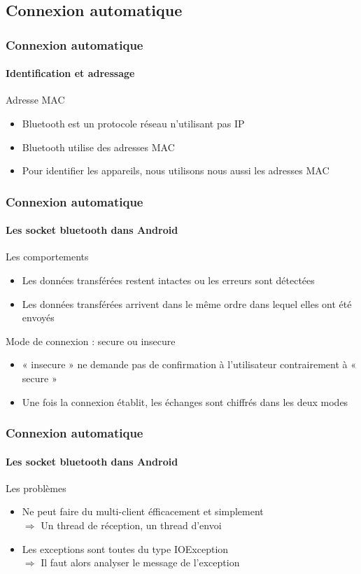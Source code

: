 \documentclass{beamer}
\begin{document}
    \subsection{Connexion automatique}
    \begin{frame}
      \frametitle{Connexion automatique}
      \framesubtitle{Identification et adressage}
      \begin{block}{Adresse MAC}
        \begin{itemize}
          \item Bluetooth est un protocole réseau n'utilisant pas IP
          \item Bluetooth utilise des adresses MAC
          \item Pour identifier les appareils, nous utilisons nous aussi les adresses MAC
        \end{itemize}
      \end{block}
    \end{frame}
    \begin{frame}
      \frametitle{Connexion automatique}
      \framesubtitle{Les socket bluetooth dans Android}
      \begin{block}{Les comportements}
        \begin{itemize}
          \item Les données transférées restent intactes ou les erreurs sont détectées
          \item Les données transférées arrivent dans le même ordre dans lequel elles ont été envoyés
        \end{itemize}
      \end{block}
      \begin{block}{Mode de connexion : secure ou insecure}
        \begin{itemize}
          \item « insecure » ne demande pas de confirmation à l'utilisateur contrairement à « secure »
          \item Une fois la connexion établit, les échanges sont chiffrés dans les deux modes
        \end{itemize}
      \end{block}
    \end{frame}
    \begin{frame}
      \frametitle{Connexion automatique}
      \framesubtitle{Les socket bluetooth dans Android}
      \begin{block}{Les problèmes}
        \begin{itemize}
          \item Ne peut faire du multi-client éfficacement et simplement \\
          $ \Rightarrow $ Un thread de réception, un thread d'envoi
          \item Les exceptions sont toutes du type IOException \\
          $ \Rightarrow $ Il faut alors analyser le message de l'exception
        \end{itemize}
      \end{block}
    \end{frame}
\end{document}
